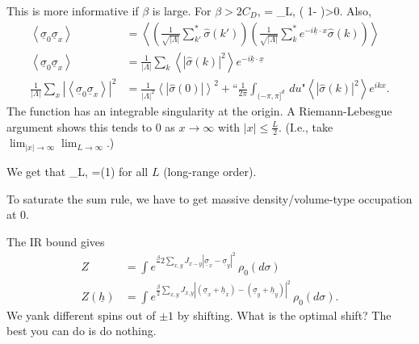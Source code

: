 This is more informative if $\beta$ is large. For $\beta >2 C_D$, 
\be
\left{}\right\rangle=
\left{}\right\rangle_{L,\beta} \ge \left( {1-} \right)>0.
\ee
Also, 
\begin{align}
\left\langle {\underline{\sigma}_0\underline{\sigma}_x}\right\rangle &= 
\left\langle {\left( { \frac{1}{\sqrt{|\Lambda|}} \sum_{k'}^* \widehat{\sigma}(k')} \right)
\left( {\frac{1}{\sqrt{|\Lambda|}} \sum_k^* e^{-i\underline{k} \cdot x} \widehat{\sigma}(k)} \right)}\right\rangle\\
\left\langle {\underline{\sigma}_0\underline{\sigma}_x}\right\rangle&= \frac{1}{|\Lambda|} \sum_k\left\langle { |\widehat{\sigma}(k)|^2}\right\rangle e^{-i\underline{k}\cdot \underline{x}}\\
\frac{1}{|\Lambda|}\sum_x\left| {\left\langle {\underline{\sigma}_0\underline{\sigma}_x}\right\rangle } \right|^2 &= \frac{1}{|\Lambda|^2} \left\langle {\left| {\widehat{\sigma}(0)} \right|}\right\rangle^2
+ \text{``}\frac{1}{2\pi} \int_{(-\pi, \pi]^d} \,du\text{"} \left\langle {|\widehat{\sigma}(k)|^2}\right\rangle e^{ikx}.
\end{align}
The function has an integrable singularity at the origin. A Riemann-Lebesgue argument shows this tends to 0 as $x\to \infty$ with $|x|\le \frac{L}{2}$. (I.e., take $\lim_{|x|\to \infty}\lim_{L\to \infty}$.)

We get that 
\be\left{}\right\rangle_{L,\beta} =\Omega(1)
\ee for all $L$ (long-range order).

To saturate the sum rule, we have to get massive density/volume-type occupation at 0.

The IR bound gives
\begin{align}
Z&=\int e^{\frac{\beta}{ }2 \sum_{x,y} J_{x-y} |\underline{\sigma}_x - \underline{\sigma}_y|^2 }\,\rho_0(d\sigma)\\
Z(\underline{h}) &= \int e^{\frac{\beta}{2}\sum_{x,y} J_{x,y}|(\underline{\sigma}_x + \underline{h}_x) - (\underline{\sigma}_y + \underline{h}_y)|^2}\, \rho_0(d\sigma).
\end{align}
We yank different spins out of $\pm1$ by shifting. What is the optimal shift? The best you can do is do nothing.

